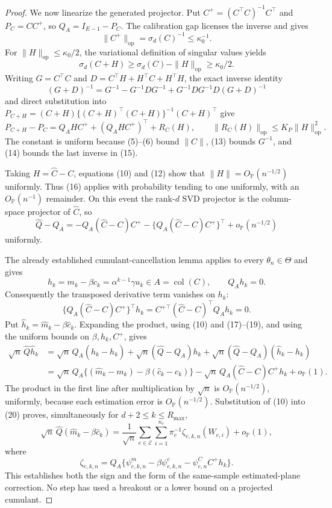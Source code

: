 \documentclass{article}
\begin{document}
\begin{proof}
We now linearize the generated projector.  Put \(C^+=(C^\top C)^{-1}C^\top\) and \(P_C=CC^+\), so \(Q_A=I_{E-1}-P_C\).  The calibration gap licenses the inverse and gives
\[
 \|C^+\|_{\mathrm{op}}=\sigma_d(C)^{-1}\leq\kappa_0^{-1}. \tag{13}
\]
For \(\|H\|_{\mathrm{op}}\leq\kappa_0/2\), the variational definition of singular values yields
\[
 \sigma_d(C+H)\geq\sigma_d(C)-\|H\|_{\mathrm{op}}
 \geq\kappa_0/2. \tag{14}
\]
Writing \(G=C^\top C\) and \(D=C^\top H+H^\top C+H^\top H\), the exact inverse identity
\[
 (G+D)^{-1}=G^{-1}-G^{-1}DG^{-1}
 +G^{-1}DG^{-1}D(G+D)^{-1} \tag{15}
\]
and direct substitution into
\(P_{C+H}=(C+H)\{(C+H)^\top(C+H)\}^{-1}(C+H)^\top\)
give
\[
 P_{C+H}-P_C
 =Q_AHC^+ +(Q_AHC^+)^\top+R_C(H),
 \qquad \|R_C(H)\|_{\mathrm{op}}
 \leq K_P\|H\|_{\mathrm{op}}^2. \tag{16}
\]
The constant is uniform because (5)--(6) bound \(\|C\|\), (13) bounds \(G^{-1}\), and (14) bounds the last inverse in (15).

Taking \(H=\widehat C-C\), equations (10) and (12) show that \(\|H\|=O_{\mathbb P}(n^{-1/2})\) uniformly.  Thus (16) applies with probability tending to one uniformly, with an \(O_{\mathbb P}(n^{-1})\) remainder.  On this event the rank-\(d\) SVD projector is the column-space projector of \(\widehat C\), so
\[
 \widehat Q-Q_A
 =-Q_A(\widehat C-C)C^+
  -\{Q_A(\widehat C-C)C^+\}^\top
  +o_{\mathbb P}(n^{-1/2}) \tag{17}
\]
uniformly.

The already established cumulant-cancellation lemma applies to every \(\theta_n\in\Theta\) and gives
\[
 h_k=m_k-\beta c_k=\alpha^{k-1}\gamma u_k\in A=\operatorname{col}(C),
 \qquad Q_Ah_k=0. \tag{18}
\]
Consequently the transposed derivative term vanishes on \(h_k\):
\[
 \{Q_A(\widehat C-C)C^+\}^\top h_k
 =C^{+\top}(\widehat C-C)^\top Q_Ah_k=0. \tag{19}
\]
Put \(\widehat h_k=\widehat m_k-\beta\widehat c_k\).  Expanding the product, using (10) and (17)--(19), and using the uniform bounds on \(\beta,h_k,C^+\), gives
\[
 \begin{aligned}
 \sqrt n\,\widehat Q\widehat h_k
 &=\sqrt n\,Q_A(\widehat h_k-h_k)
   +\sqrt n(\widehat Q-Q_A)h_k
   +\sqrt n(\widehat Q-Q_A)(\widehat h_k-h_k)\\
 &=\sqrt n\,Q_A\{(\widehat m_k-m_k)
       -\beta(\widehat c_k-c_k)\}
   -\sqrt n\,Q_A(\widehat C-C)C^+h_k
   +o_{\mathbb P}(1).
 \end{aligned} \tag{20}
\]
The product in the first line after multiplication by \(\sqrt n\) is \(O_{\mathbb P}(n^{-1/2})\), uniformly, because each estimation error is \(O_{\mathbb P}(n^{-1/2})\).  Substitution of (10) into (20) proves, simultaneously for \(d+2\leq k\leq R_{\max}\),
\[
 \sqrt n\,\widehat Q(\widehat m_k-\beta\widehat c_k)
 =\frac1{\sqrt n}\sum_{e\in\mathcal E}\sum_{i=1}^{n_e}
   \pi_e^{-1}\zeta_{e,k,n}(W_{e,i})+o_{\mathbb P}(1), \tag{21}
\]
where
\[
 \zeta_{e,k,n}
 =Q_A\{\psi^m_{e,k,n}-\beta\psi^c_{e,k,n}
          -\psi^C_{e,n}C^+h_k\}. \tag{22}
\]
This establishes both the sign and the form of the same-sample estimated-plane correction.  No step has used a breakout or a lower bound on a projected cumulant.


\end{proof}
\end{document}
